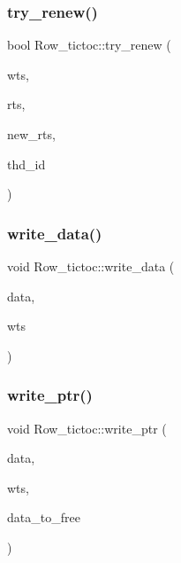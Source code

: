 \mbox{\label{classRow__tictoc_a0e3056dff2f6ebc21de23fbd3ac35ea6}} 
\subsubsection{\texorpdfstring{try\+\_\+renew()}{try\_renew()}}
{\footnotesize\ttfamily bool Row\+\_\+tictoc\+::try\+\_\+renew (\begin{DoxyParamCaption}\item[{\hyperlink{global_8h_aaf095dfc9b10f757c968fe146ad7e724}{ts\+\_\+t}}]{wts,  }\item[{\hyperlink{global_8h_aaf095dfc9b10f757c968fe146ad7e724}{ts\+\_\+t}}]{rts,  }\item[{\hyperlink{global_8h_aaf095dfc9b10f757c968fe146ad7e724}{ts\+\_\+t} \&}]{new\+\_\+rts,  }\item[{uint64\+\_\+t}]{thd\+\_\+id }\end{DoxyParamCaption})}

\mbox{\label{classRow__tictoc_a6af47480f6f4230236f47b2f2b2de429}} 
\subsubsection{\texorpdfstring{write\+\_\+data()}{write\_data()}}
{\footnotesize\ttfamily void Row\+\_\+tictoc\+::write\+\_\+data (\begin{DoxyParamCaption}\item[{\hyperlink{classrow__t}{row\+\_\+t} $\ast$}]{data,  }\item[{\hyperlink{global_8h_aaf095dfc9b10f757c968fe146ad7e724}{ts\+\_\+t}}]{wts }\end{DoxyParamCaption})}

\mbox{\label{classRow__tictoc_a8cfc065bb14c25213e614798ba8b3b4a}} 
\subsubsection{\texorpdfstring{write\+\_\+ptr()}{write\_ptr()}}
{\footnotesize\ttfamily void Row\+\_\+tictoc\+::write\+\_\+ptr (\begin{DoxyParamCaption}\item[{\hyperlink{classrow__t}{row\+\_\+t} $\ast$}]{data,  }\item[{\hyperlink{global_8h_aaf095dfc9b10f757c968fe146ad7e724}{ts\+\_\+t}}]{wts,  }\item[{char $\ast$\&}]{data\+\_\+to\+\_\+free }\end{DoxyParamCaption})}



